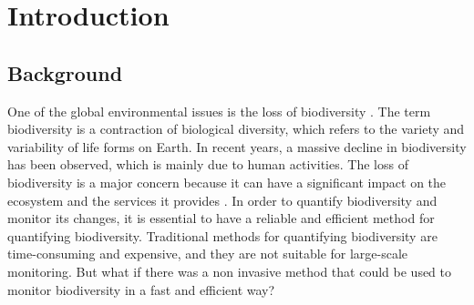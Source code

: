 

\section{Introduction}
\label{section1}

\subsection{Background}%

One of the global environmental issues is the loss of biodiversity \autocite{cardinaleBiodiversityLossIts2012}. 
The term biodiversity is a contraction of biological diversity, which refers to the variety and variability of life forms on Earth.
In recent years, a massive decline in biodiversity has been observed, which is mainly due to human activities. 
The loss of biodiversity is a major concern because it can have a significant impact on the ecosystem and the services it provides \autocite{brondizioGlobalAssessmentReport2019}. 
In order to quantify biodiversity and monitor its changes, it is essential to have a reliable and efficient method for quantifying biodiversity.
Traditional methods for quantifying biodiversity are time-consuming and expensive, and they are not suitable for large-scale monitoring.
But what if there was a non invasive method that could be used to monitor biodiversity in a fast and efficient way?

